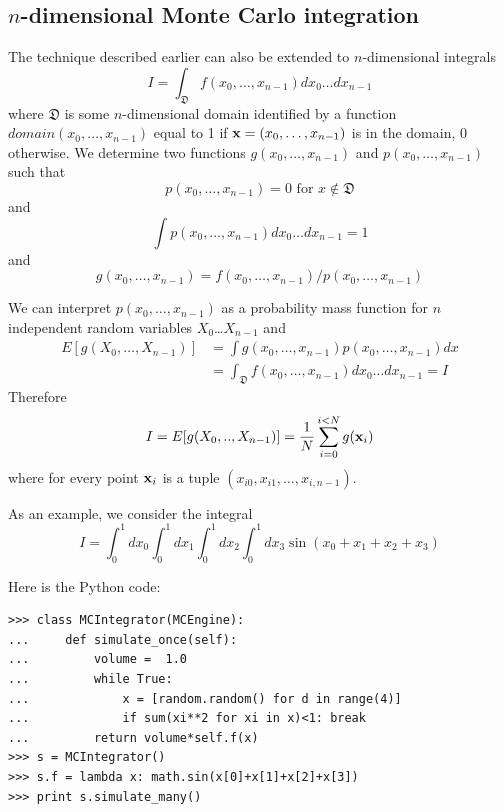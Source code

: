 \documentclass[justified,sixbynine]{tufte-book}
\theoremstyle{plain}%
\theoremstyle{definition}
\theoremstyle{remark}
\begin{document}
\begin{fullwidth}
\goodbreak\subsection{$n$-dimensional Monte Carlo integration}

The technique described earlier can also be extended to $n$-dimensional integrals
\begin{equation}
I=\int_{{\mathfrak D}}f(x_0,\dots,x_{n-1})dx_0\dots dx_{n-1}
\end{equation}
where ${\mathfrak D}$ is some $n$-dimensional domain identified by a function $%
domain(x_0,\dots,x_{n-1})$ equal to 1 if ${\bf x}=(x_0,\dots,x_{n-1})$ is in the
domain, 0 otherwise. We determine two functions $g(x_0,\dots,x_{n-1})$ and $%
p(x_0,\dots,x_{n-1})$ such that
\begin{equation}
p(x_0,\dots,x_{n-1})=0\text{ for }x\notin {\mathfrak D}
\end{equation}
and
\begin{equation}
\int p(x_0,\dots,x_{n-1})dx_0\dots dx_{n-1}=1
\end{equation}
and
\begin{equation}
g(x_0,\dots,x_{n-1})=f(x_0,\dots,x_{n-1})/p(x_0,\dots,x_{n-1})
\end{equation}

We can interpret $p(x_0,\dots,x_{n-1})$ as a probability mass function for $n$
independent random variables $X_0$\dots$X_{n-1}$ and
\begin{align}
E[g(X_0,\dots,X_{n-1})] &= \int g(x_0,\dots,x_{n-1})p(x_0,\dots,x_{n-1})dx \\
&= \int_{{\mathfrak D}}f(x_0,\dots,x_{n-1})dx_0\dots dx_{n-1}=I
\end{align}
Therefore
\begin{equation}
I=E[g(X_0,..,X_{n-1})] = \frac 1N\sum_{i=0}^{i<N}g({\bf x}_i)
\end{equation}
where for every point ${\bf x}_i$ is a tuple $(x_{i0},x_{i1},\dots,x_{i,n-1})$.

As an example, we consider the integral
\begin{equation}
I = \int_0^1 dx_0 \int_0^1 dx_1 \int_0^1 dx_2 \int_0^1 dx_3 \sin(x_0+x_1+x_2+x_3)
\end{equation}

Here is the Python code:
\begin{lstlisting}
>>> class MCIntegrator(MCEngine):
...     def simulate_once(self):
...         volume =  1.0
...         while True:
...             x = [random.random() for d in range(4)]
...             if sum(xi**2 for xi in x)<1: break
...         return volume*self.f(x)
>>> s = MCIntegrator()
>>> s.f = lambda x: math.sin(x[0]+x[1]+x[2]+x[3])
>>> print s.simulate_many()
\end{lstlisting}


\end{fullwidth}
\end{document}

